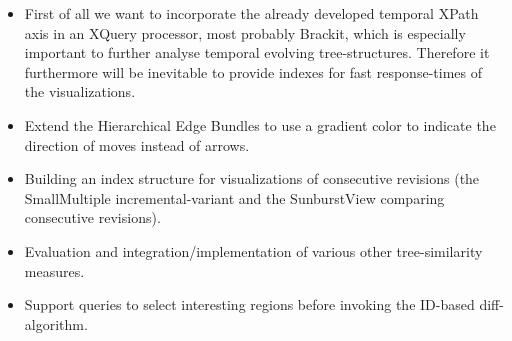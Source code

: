\begin{itemize}
\item First of all we want to incorporate the already developed temporal XPath axis in an XQuery processor, most probably Brackit\cite{Brackit}, which is especially important to further analyse temporal evolving tree-structures. Therefore it furthermore will be inevitable to provide indexes for fast response-times of the visualizations. 
\item Extend the Hierarchical Edge Bundles to use a gradient color to indicate the direction of moves instead of arrows.
\item Building an index structure for visualizations of consecutive revisions (the SmallMultiple incremental-variant and the SunburstView comparing consecutive revisions).
\item Evaluation and integration/implementation of various other tree-similarity measures.
\item Support queries to select interesting regions before invoking the ID-based diff-algorithm.
\end{itemize} 

